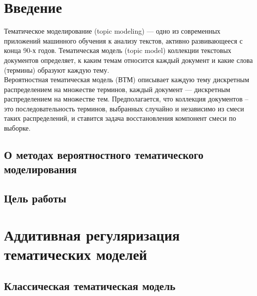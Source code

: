 \documentclass[12pt]{article}
\renewcommand{\baselinestretch}{1.4}
\begin{document}
	\tableofcontents
	\newpage
	\renewcommand{\baselinestretch}{1.5}
	\section{Введение}
Тематическое моделирование (topic modeling) — одно из современных приложений машинного обучения к анализу текстов, активно развивающееся с конца 90-х годов. Тематическая модель (topic model) коллекции текстовых документов определяет, к каким темам относится каждый документ и какие слова (термины) образуют каждую тему.\\
Вероятностная тематическая модель (ВТМ) описывает каждую тему дискретным распределением на множестве терминов, каждый документ — дискретным распределением на множестве тем. Предполагается, что коллекция документов -- это последовательность терминов, выбранных случайно и независимо из смеси таких распределений, и ставится задача восстановления компонент смеси по выборке.
	\subsection{О методах вероятностного тематического моделирования}
	\subsection{Цель работы}

	\section{Аддитивная регуляризация тематических моделей}

	\subsection{Классическая тематическая модель}
\end{document}

